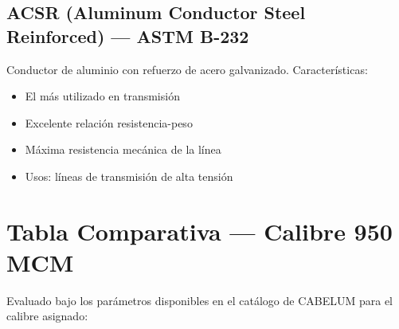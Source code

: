 \documentclass[12pt,a4paper]{article}
\begin{document}
\subsection{ACSR (Aluminum Conductor Steel Reinforced) --- ASTM B-232}
Conductor de aluminio con refuerzo de acero galvanizado. Características:
\begin{itemize}
    \item El más utilizado en transmisión
    \item Excelente relación resistencia-peso
    \item Máxima resistencia mecánica de la línea
    \item Usos: líneas de transmisión de alta tensión
\end{itemize}

\section{Tabla Comparativa --- Calibre 950 MCM}

Evaluado bajo los parámetros disponibles en el catálogo de CABELUM para el
calibre asignado:
\end{document}
